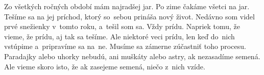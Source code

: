 







Zo všetkých ročných období mám najradšej jar. Po zime čakáme všetci na jar. Tešíme sa na jej príchod, ktorý so~sebou prináša nový život.  Nedávno som videl prvé snežienky v~tomto roku, a~tešil som sa. Vždy prídu. Napriek tomu, že vieme, že prídu, aj tak sa tešíme. Ale niektoré veci prídu, len keď do~nich vstúpime a~pripravíme sa na~ne. Musíme sa zámerne zúčastniť toho procesu. Paradajky alebo uhorky nebudú, ani muškáty alebo astry, ak nezasadíme semená. Ale vieme skoro isto, že ak zasejeme semená, niečo z~nich vzíde.

